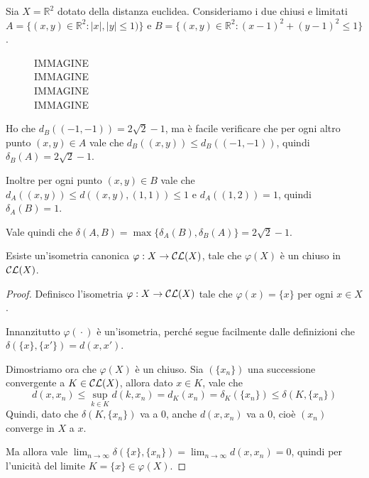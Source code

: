 \begin{example}
	Sia $X=\mathbb{R}^2$ dotato della distanza euclidea. Consideriamo i due chiusi e limitati $A=\{(x,y)\in\mathbb{R}^2:|x|,|y|\le 1)\}$ e $B=\{(x,y)\in\mathbb{R}^2:(x-1)^2+(y-1)^2\le 1\}$.
	\begin{figure}[h]
	\begin{center}
		IMMAGINE\\
		IMMAGINE\\
		IMMAGINE\\
		IMMAGINE
	\end{center}
	\end{figure}
	
	Ho che $d_B((-1,-1))=2\sqrt{2}-1$, ma è facile verificare che per ogni altro punto $(x,y)\in A$ vale che $d_B((x,y))\le d_B((-1,-1))$, quindi $\delta_B(A)=2\sqrt{2}-1$.
	
	Inoltre per ogni punto $(x,y)\in B$ vale che $d_A((x,y))\le d((x,y),(1,1))\le 1$ e $d_A((1,2))=1$, quindi $\delta_A(B)=1$.
	
	Vale quindi che $\delta(A,B)=\max\{ \delta_A(B),\delta_B(A) \}=2\sqrt{2}-1$.
\end{example}


\begin{lemma}\label{IsometriaCanonica}
	Esiste un'isometria canonica $\varphi: X\to \mathcal{CL}(X)$, tale che $\varphi(X)$ è un chiuso in $\mathcal{CL}(X)$.
\end{lemma}
\begin{proof}
	Definisco l'isometria $\varphi: X\to\mathcal{CL}(X)$ tale che $\varphi(x)=\{x\}$ per ogni $x\in X$. 
	
	Innanzitutto $\varphi({}\cdot{})$ è un'isometria, perché segue facilmente dalle definizioni che $\delta(\{ x \}, \{ x' \})=d(x,x')$.
	
	Dimostriamo ora che $\varphi(X)$ è un chiuso. Sia $(\{ x_n \})$ una successione convergente a $K\in \mathcal{CL}(X)$, allora dato $x\in K$, vale che
	\begin{equation*}
		d(x,x_n)\le \sup_{k\in K} d(k,x_n)=d_K(x_n)=\delta_K(\{x_n\})\le \delta(K,\{x_n \})
	\end{equation*}
	Quindi, dato che $\delta(K,\{x_n \})$ va a 0, anche $d(x,x_n)$ va a 0, cioè $(x_n)$ converge in $X$ a $x$. 
	
	Ma allora vale $\lim_{n\to\infty} \delta(\{x\}, \{ x_n \})=\lim_{n\to\infty} d(x,x_n)=0$, quindi per l'unicità del limite $K=\{x\}\in\varphi(X)$.
\end{proof}









